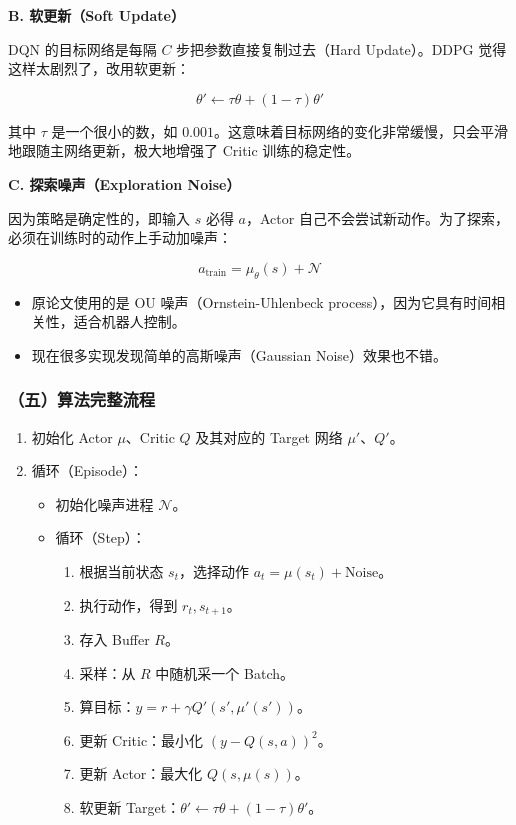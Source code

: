 \textbf{B. 软更新（Soft Update）}

DQN 的目标网络是每隔 \(C\) 步把参数直接复制过去（Hard Update）。DDPG 觉得这样太剧烈了，改用软更新：

\[
\theta'
\leftarrow
\tau\theta+(1-\tau)\theta'
\]

其中 \(\tau\) 是一个很小的数，如 \(0.001\)。这意味着目标网络的变化非常缓慢，只会平滑地跟随主网络更新，极大地增强了 Critic 训练的稳定性。

\textbf{C. 探索噪声（Exploration Noise）}

因为策略是确定性的，即输入 \(s\) 必得 \(a\)，Actor 自己不会尝试新动作。为了探索，必须在训练时的动作上手动加噪声：

\[
a_{\mathrm{train}}
=
\mu_\theta(s)+\mathcal{N}
\]

\begin{itemize}
\tightlist
\item
  原论文使用的是 OU 噪声（Ornstein-Uhlenbeck process），因为它具有时间相关性，适合机器人控制。
\item
  现在很多实现发现简单的高斯噪声（Gaussian Noise）效果也不错。
\end{itemize}

\hypertarget{ux4e94ux7b97ux6cd5ux5b8cux6574ux6d41ux7a0b}{%
\subsubsection{（五）算法完整流程}\label{ux4e94ux7b97ux6cd5ux5b8cux6574ux6d41ux7a0b}}

\begin{enumerate}
\def\labelenumi{\arabic{enumi}.}
\tightlist
\item
  初始化 Actor \(\mu\)、Critic \(Q\) 及其对应的 Target 网络 \(\mu'\)、\(Q'\)。
\item
  循环（Episode）：

  \begin{itemize}
  \tightlist
  \item
    初始化噪声进程 \(\mathcal{N}\)。
  \item
    循环（Step）：

    \begin{enumerate}
    \def\labelenumii{\arabic{enumii}.}
    \tightlist
    \item
      根据当前状态 \(s_t\)，选择动作 \(a_t=\mu(s_t)+\mathrm{Noise}\)。
    \item
      执行动作，得到 \(r_t,s_{t+1}\)。
    \item
      存入 Buffer \(R\)。
    \item
      采样：从 \(R\) 中随机采一个 Batch。
    \item
      算目标：\(y=r+\gamma Q'(s',\mu'(s'))\)。
    \item
      更新 Critic：最小化 \((y-Q(s,a))^{2}\)。
    \item
      更新 Actor：最大化 \(Q(s,\mu(s))\)。
    \item
      软更新 Target：\(\theta'\leftarrow\tau\theta+(1-\tau)\theta'\)。
    \end{enumerate}
  \end{itemize}
\end{enumerate}

